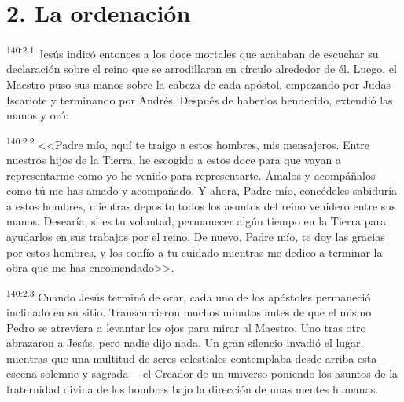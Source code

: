 \section*{2. La ordenación}
\par 
\textsuperscript{140:2.1} Jesús indicó entonces a los doce mortales que acababan de escuchar su declaración sobre el reino que se arrodillaran en círculo alrededor de él. Luego, el Maestro puso sus manos sobre la cabeza de cada apóstol, empezando por Judas Iscariote y terminando por Andrés. Después de haberlos bendecido, extendió las manos y oró:

\par 
\textsuperscript{140:2.2} <<Padre mío, aquí te traigo a estos hombres, mis mensajeros. Entre nuestros hijos de la Tierra, he escogido a estos doce para que vayan a representarme como yo he venido para representarte. Ámalos y acompáñalos como tú me has amado y acompañado. Y ahora, Padre mío, concédeles sabiduría a estos hombres, mientras deposito todos los asuntos del reino venidero entre sus manos. Desearía, si es tu voluntad, permanecer algún tiempo en la Tierra para ayudarlos en sus trabajos por el reino. De nuevo, Padre mío, te doy las gracias por estos hombres, y los confío a tu cuidado mientras me dedico a terminar la obra que me has encomendado>>.

\par 
\textsuperscript{140:2.3} Cuando Jesús terminó de orar, cada uno de los apóstoles permaneció inclinado en su sitio. Transcurrieron muchos minutos antes de que el mismo Pedro se atreviera a levantar los ojos para mirar al Maestro. Uno tras otro abrazaron a Jesús, pero nadie dijo nada. Un gran silencio invadió el lugar, mientras que una multitud de seres celestiales contemplaba desde arriba esta escena solemne y sagrada ---el Creador de un universo poniendo los asuntos de la fraternidad divina de los hombres bajo la dirección de unas mentes humanas.


